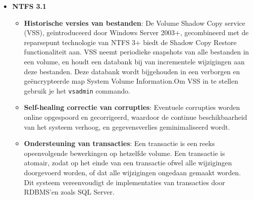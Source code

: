 \begin{enumerate}
{\begin{itemize}
\begin{itemize}
						\item \textbf{Sparse bestanden}: Indien een bestand sparse is, kan NTFS enkel schijfruimte toewijzen aan de delen van grote bestanden waarnaar effectief wordt geschreven. Om een bestand als sparse te markeren, moet je het commando \texttt{fsutil sparse setflag \emph{bestandsnaam}} gebruiken. 
						\item \textbf{File markers voor Remote Storage Service}: 
						\item \textbf{Transparante encryptie en decodering}:  (\texttt{cipher /e /a /s:...})
						\item \textbf{Individuele diskquota op volumeniveau}: Voor elke gebruiker kan er een diskquota op volumeniveau ingesteld worden, zodat er een  maximale beschikbare opslagcapaciteit voor die gebruiker in een specifiek volume is. Om quotabeheer in te schakelen op een specifiek volume gebruik je het commando \texttt{fsutil quota enforce \emph{volumenaam}}. Om na te gaan of er gebruikers over de limiet zitten, gebruik je het commando \texttt{fsutil quota violations}. Informatie over het gebruik van volumes wordt geregistreerd per security ID en niet per accountnaam.
					\end{itemize}
				\item \textbf{NTFS 3.1}
					\begin{itemize}
						\item \textbf{Historische versies van bestanden}: De Volume Shadow Copy service (VSS), geïntroduceerd door Windows Server 2003+, gecombineerd met de reparsepunt technologie van NTFS 3+ biedt de Shadow Copy Restore functionaliteit aan. VSS neemt periodieke snapshots van alle bestanden in een volume, en houdt een databank bij van incrementele wijzigingen aan deze bestanden. Deze databank wordt bijgehouden in een verborgen en geëncrypteerde map System Volume Information.Om VSS in te stellen gebruik je het \texttt{vsadmin} commando.
						\item \textbf{Self-healing correctie van corrupties}: Eventuele corrupties worden online opgespoord en gecorrigeerd, waardoor de continue beschikbaarheid van het systeem verhoog, en gegevensverlies geminimaliseerd wordt.
						\item \textbf{Ondersteuning van transacties}: Een transactie is een reeks opeenvolgende bewerkingen op hetzelfde volume. Een transactie is atomair, zodat op het einde van een transactie ofwel alle wijzigingen doorgevoerd worden, of dat alle wijzigingen ongedaan gemaakt worden. Dit systeem vereenvoudigt de implementaties van transacties door RDBMS'en zoals SQL Server. 

\end{itemize}
\end{itemize}}
\end{enumerate}
